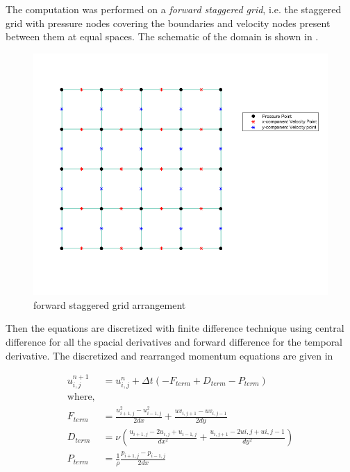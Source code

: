 \par The computation was performed on a \emph{forward staggered grid}, i.e. the
staggered grid with pressure nodes covering the boundaries and velocity nodes
present between them at equal spaces. The schematic of the domain is shown
in .
\begin{figure}
   \centering
    \includegraphics[scale=0.5]{supporting_documents/staggered_grid_5X5.png}
    \caption{forward staggered grid arrangement}
    \label{staggered_grid}
\end{figure}

\par Then the equations are discretized with finite difference technique using
central difference for all the spacial derivatives and forward difference for
the temporal derivative. The discretized and rearranged momentum equations
are given in 

\begin{align}
    u_{i,j}^{n+1} &= u_{i,j}^{n} + \Delta t \left(-F_{term} + D_{term} - P_{term}\right) \label{x_mmtm_discretized} \\
    \text{where,} \nonumber \\
    F_{term} &= \frac{u_{i+1,j}^2 - u_{i-1,j}^2}{2 dx} + \frac{uv_{i,j+1} - uv_{i,j-1}}{2 dy} \nonumber \\
    D_{term} & = \nu \left(\frac{u_{i+1,j} - 2 u_{i,j} + u_{i-1,j}}{dx^2} + \frac{u_{i,j+1} - 2 u{i,j} + u{i,j-1}}{dy^2}\right) \nonumber \\
    P_{term} &= \frac{1}{\rho}\frac{p_{i+1,j} - p_{i-1,j}}{2 dx} \nonumber
\end{align}

